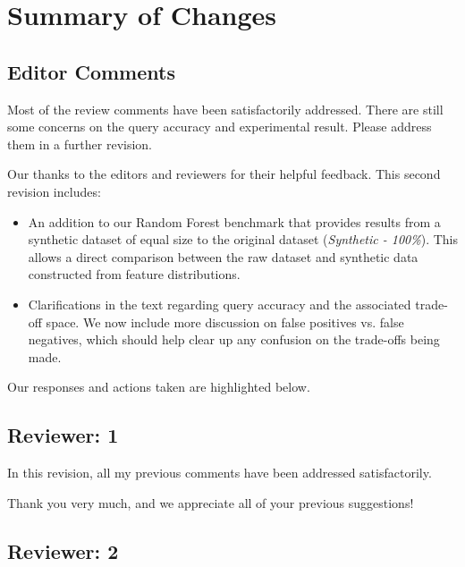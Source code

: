 \documentclass{article}
\begin{document}
\section*{Summary of Changes}\label{summary-of-changes}
\subsection*{Editor Comments}\label{editor-comments}

Most of the review comments have been satisfactorily addressed. There are still some concerns on the query accuracy and experimental result. Please address them in a further revision.

\begin{tcolorbox}
    Our thanks to the editors and reviewers for their helpful feedback. This second revision includes:

\begin{itemize}
    \item An addition to our Random Forest benchmark that provides results from a synthetic dataset of equal size to the original dataset (\emph{Synthetic - 100\%}). This allows a direct comparison between the raw dataset and synthetic data constructed from feature distributions.

    \item Clarifications in the text regarding query accuracy and the associated trade-off space. We now include more discussion on false positives vs. false negatives, which should help clear up any confusion on the trade-offs being made.
\end{itemize}
%
Our responses and actions taken are highlighted below.
\end{tcolorbox}

\vspace{1em}

\subsection*{Reviewer: 1}\label{reviewer-1}

In this revision, all my previous comments have been addressed satisfactorily.

\begin{tcolorbox}
    Thank you very much, and we appreciate all of your previous suggestions!
\end{tcolorbox}

\vspace{1em}

\subsection*{Reviewer: 2}\label{reviewer-2}
\end{document}
